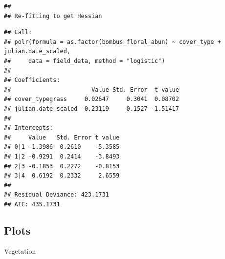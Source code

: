 \documentclass[
]{article}
\begin{document}
\begin{verbatim}
## 
## Re-fitting to get Hessian
\end{verbatim}

\begin{verbatim}
## Call:
## polr(formula = as.factor(bombus_floral_abun) ~ cover_type + julian.date_scaled, 
##     data = field_data, method = "logistic")
## 
## Coefficients:
##                       Value Std. Error  t value
## cover_typegrass     0.02647     0.3041  0.08702
## julian.date_scaled -0.23119     0.1527 -1.51417
## 
## Intercepts:
##     Value   Std. Error t value
## 0|1 -1.3986  0.2610    -5.3585
## 1|2 -0.9291  0.2414    -3.8493
## 2|3 -0.1853  0.2272    -0.8153
## 3|4  0.6192  0.2332     2.6559
## 
## Residual Deviance: 423.1731 
## AIC: 435.1731
\end{verbatim}

\subsection{Plots}\label{plots-2}

Vegetation
\end{document}
